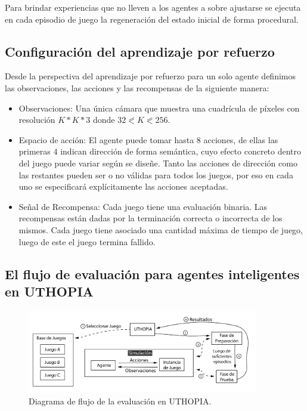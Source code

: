 Para brindar experiencias que no lleven a los agentes a sobre ajustarse se ejecuta en cada episodio de juego la regeneración del estado inicial de forma procedural.

\subsection{Configuración del aprendizaje por refuerzo}

Desde la perspectiva del aprendizaje por refuerzo para un solo agente definimos las observaciones, las acciones y las recompensas de la siguiente manera:

\begin{itemize}
    \item Observaciones: Una única cámara que muestra una cuadrícula de píxeles con resolución $K * K * 3$ donde $32 \eqslantless K \eqslantless 256$.
    \item Espacio de acción: El agente puede tomar hasta $8$ acciones, de ellas las primeras $4$ indican dirección de forma semántica, cuyo efecto concreto dentro del juego puede variar según se diseñe. Tanto las acciones de dirección como las restantes pueden ser o no válidas para todos los juegos, por eso en cada uno se especificará explícitamente las acciones aceptadas.
    \item Señal de Recompensa: Cada juego tiene una evaluación binaria. Las recompensas están dadas por la terminación correcta o incorrecta de los mismos. Cada juego tiene asociado una cantidad máxima de tiempo de juego, luego de este el juego termina fallido.
\end{itemize} 

\subsection{El flujo de evaluación para agentes inteligentes en UTHOPIA}

\begin{figure}[ht!]
    \centering
    \includegraphics[width=0.9\textwidth]{Graphics/uthopia_flow.png}
    \caption{Diagrama de flujo de la evaluación en UTHOPIA.}
    \label{fig:uthopia_flow}
\end{figure}

